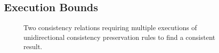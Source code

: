 

\subsection{Execution Bounds} %
\label{chap:synchronization:combination:bounds}

\begin{figure}
    \centering
    
    \caption[Multiple execution of consistency preservation rules]{Two consistency relations requiring multiple executions of unidirectional consistency preservation rules to find a consistent result.}
    \label{fig:synchronization:multiple_unidirectional_execution}
\end{figure}

